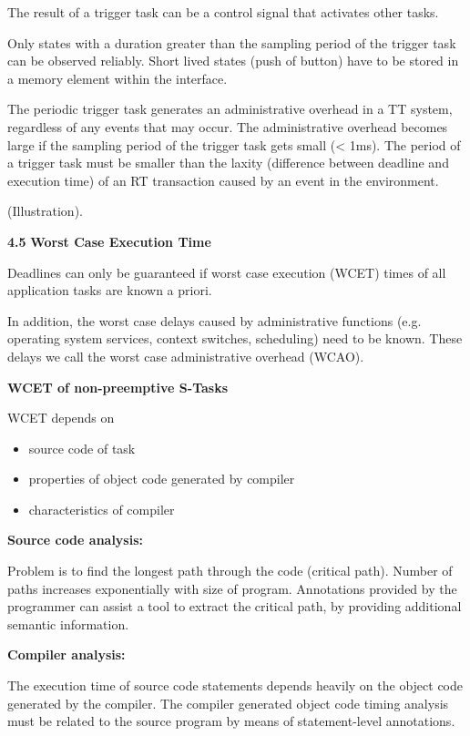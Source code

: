 The result of a trigger task can be a control signal that activates
other tasks.

Only states with a duration greater than the sampling period of the
trigger task can be observed reliably. Short lived states (push of
button) have to be stored in a memory element within the interface.

The periodic trigger task generates an administrative overhead in a TT
system, regardless of any events that may occur. The administrative
overhead becomes large if the sampling period of the trigger task gets
small (\textless{} 1ms). The period of a trigger task must be smaller
than the laxity (difference between deadline and execution time) of an
RT transaction caused by an event in the environment.

(Illustration).

\textbf{4.5} \protect\hypertarget{teil6}{}{}\textbf{Worst Case Execution
Time}

Deadlines can only be guaranteed if worst case execution (WCET) times of
all application tasks are known a priori.

In addition, the worst case delays caused by administrative functions
(e.g. operating system services, context switches, scheduling) need to
be known. These delays we call the worst case administrative overhead
(WCAO).

\textbf{WCET of non-preemptive S-Tasks}

WCET depends on

\begin{itemize}
\item
  source code of task
\item
  properties of object code generated by compiler
\item
  characteristics of compiler
\end{itemize}

\textbf{Source code analysis:}

Problem is to find the longest path through the code (critical path).
Number of paths increases exponentially with size of program.
Annotations provided by the programmer can assist a tool to extract the
critical path, by providing additional semantic information.

\textbf{Compiler analysis:}

The execution time of source code statements depends heavily on the
object code generated by the compiler. The compiler generated object
code timing analysis must be related to the source program by means of
statement-level annotations.

